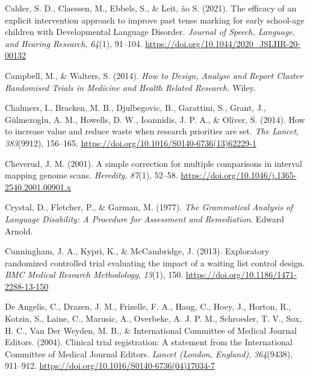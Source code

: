 \documentclass{krantz}
\newlength{\cslhangindent}
\newlength{\cslentryspacingunit} %
\newenvironment{CSLReferences}[2] %
{%
\setlength{\parindent}{0pt}
\ifodd #1
\let\oldpar\par
\def\par{\hangindent=\cslhangindent\oldpar}
\fi
\setlength{\parskip}{#2\cslentryspacingunit}
}%
{}
\begin{document}
\begin{CSLReferences}{1}{0}
\leavevmode{}%
Calder, S. D., Claessen, M., Ebbels, S., \& Leit, ão S. (2021). The efficacy of an explicit intervention approach to improve past tense marking for early school-age children with {Developmental Language Disorder}. \emph{Journal of Speech, Language, and Hearing Research}, \emph{64}(1), 91--104. \url{https://doi.org/10.1044/2020_JSLHR-20-00132}

\leavevmode{}%
Campbell, M., \& Walters, S. (2014). \emph{How to {Design}, {Analyse} and {Report Cluster Randomised Trials} in {Medicine} and {Health Related Research}.} {Wiley}.

\leavevmode{}%
Chalmers, I., Bracken, M. B., Djulbegovic, B., Garattini, S., Grant, J., Gülmezoglu, A. M., Howells, D. W., Ioannidis, J. P. A., \& Oliver, S. (2014). How to increase value and reduce waste when research priorities are set. \emph{The Lancet}, \emph{383}(9912), 156--165. \url{https://doi.org/10.1016/S0140-6736(13)62229-1}

\leavevmode{}%
Cheverud, J. M. (2001). A simple correction for multiple comparisons in interval mapping genome scans. \emph{Heredity}, \emph{87}(1), 52--58. \url{https://doi.org/10.1046/j.1365-2540.2001.00901.x}

\leavevmode{}%
Crystal, D., Fletcher, P., \& Garman, M. (1977). \emph{The {Grammatical Analysis} of {Language Disability}: {A Procedure} for {Assessment} and {Remediation}}. {Edward Arnold}.

\leavevmode{}%
Cunningham, J. A., Kypri, K., \& McCambridge, J. (2013). Exploratory randomized controlled trial evaluating the impact of a waiting list control design. \emph{BMC Medical Research Methodology}, \emph{13}(1), 150. \url{https://doi.org/10.1186/1471-2288-13-150}

\leavevmode{}%
De Angelis, C., Drazen, J. M., Frizelle, F. A., Haug, C., Hoey, J., Horton, R., Kotzin, S., Laine, C., Marusic, A., Overbeke, A. J. P. M., Schroeder, T. V., Sox, H. C., Van Der Weyden, M. B., \& International Committee of Medical Journal Editors. (2004). Clinical trial registration: A statement from the {International Committee} of {Medical Journal Editors}. \emph{Lancet (London, England)}, \emph{364}(9438), 911--912. \url{https://doi.org/10.1016/S0140-6736(04)17034-7}


\end{CSLReferences}
\end{document}
